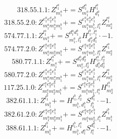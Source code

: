 \documentclass[letterpaper,10pt,fleqn,leqno,onecolumn]{article}
\begin{document}
\begin{equation} \;\;\;\;\;\;  318.55.1.1: Z^{l_{1}^{a}}_{m_{1}^{a}}+=S^{d_{1}^{a}}_{m_{1}^{a}}H^{l_{1}^{a}}_{d_{1}^{a}} \end{equation}
\begin{equation} \;\;\;\;\;\;  318.55.2.0: Z^{e_{1}^{a}e_{2}^{a}e_{1}^{b}}_{m_{1}^{a}m_{2}^{a}m_{1}^{b}}+=S^{e_{1}^{a}e_{2}^{a}e_{1}^{b}}_{m_{1}^{a}m_{1}^{b},l_{1}^{a}}Z^{l_{1}^{a}}_{m_{2}^{a}} \end{equation}
\begin{equation} \;\;\;\;\;\;  574.77.1.1: Z^{l_{1}^{a}}_{m_{1}^{a}}+=S^{d_{1}^{a}d_{1}^{b}}_{m_{1}^{a},l_{1}^{b}}H^{l_{1}^{b},l_{1}^{a}}_{d_{1}^{a}d_{1}^{b}}\cdot -1. \end{equation}
\begin{equation} \;\;\;\;\;\;  574.77.2.0: Z^{e_{1}^{a}e_{2}^{a}e_{1}^{b}}_{m_{1}^{a}m_{2}^{a}m_{1}^{b}}+=S^{e_{1}^{a}e_{2}^{a}e_{1}^{b}}_{m_{1}^{a}m_{1}^{b},l_{1}^{a}}Z^{l_{1}^{a}}_{m_{2}^{a}} \end{equation}
\begin{equation} \;\;\;\;\;\;  580.77.1.1: Z^{l_{1}^{a}}_{m_{1}^{a}}+=S^{d_{1}^{a}d_{2}^{a}}_{m_{1}^{a},l_{2}^{a}}H^{l_{1}^{a},l_{2}^{a}}_{d_{1}^{a}d_{2}^{a}} \end{equation}
\begin{equation} \;\;\;\;\;\;  580.77.2.0: Z^{e_{1}^{a}e_{2}^{a}e_{1}^{b}}_{m_{1}^{a}m_{2}^{a}m_{1}^{b}}+=S^{e_{1}^{a}e_{2}^{a}e_{1}^{b}}_{m_{1}^{a}m_{1}^{b},l_{1}^{a}}Z^{l_{1}^{a}}_{m_{2}^{a}} \end{equation}
\begin{equation} \;\;\;\;\;\;  117.25.1.0: Z^{e_{1}^{a}e_{2}^{a}e_{1}^{b}}_{m_{1}^{a}m_{2}^{a}m_{1}^{b}}+=S^{e_{1}^{a}e_{2}^{a}e_{1}^{b}}_{m_{1}^{a}m_{1}^{b},l_{1}^{a}}H^{l_{1}^{a}}_{m_{2}^{a}} \end{equation}
\begin{equation} \;\;\;\;\;\;  382.61.1.1: Z^{l_{1}^{b}}_{m_{1}^{b}}+=H^{l_{1}^{b},l_{2}^{b}}_{m_{1}^{b},d_{1}^{b}}S^{d_{1}^{b}}_{l_{2}^{b}}\cdot -1. \end{equation}
\begin{equation} \;\;\;\;\;\;  382.61.2.0: Z^{e_{1}^{a}e_{2}^{a}e_{1}^{b}}_{m_{1}^{a}m_{2}^{a}m_{1}^{b}}+=S^{e_{1}^{a}e_{2}^{a}e_{1}^{b}}_{m_{1}^{a}m_{2}^{a},l_{1}^{b}}Z^{l_{1}^{b}}_{m_{1}^{b}} \end{equation}
\begin{equation} \;\;\;\;\;\;  388.61.1.1: Z^{l_{1}^{b}}_{m_{1}^{b}}+=H^{l_{1}^{b},l_{1}^{a}}_{m_{1}^{b},d_{1}^{a}}S^{d_{1}^{a}}_{l_{1}^{a}}\cdot -1. \end{equation}
\end{document}
